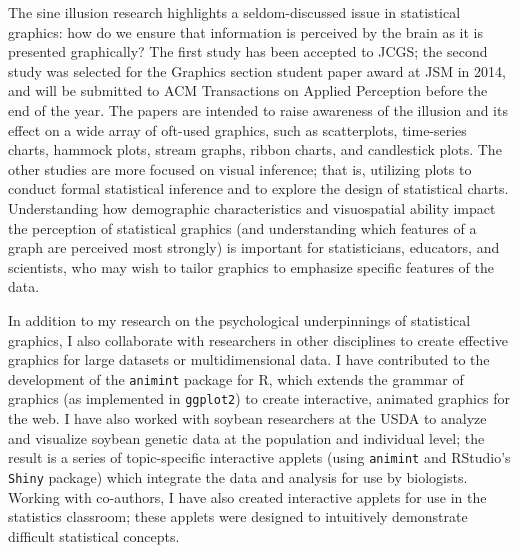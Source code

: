 \documentclass[11pt,letterpaper,sans,unicode]{moderncv}        %
\begin{document}
The sine illusion research highlights a seldom-discussed issue in statistical graphics: how do we ensure that information is perceived by the brain as it is presented graphically? The first study has been accepted to JCGS; the second study was selected for the Graphics section student paper award at JSM in 2014, and will be submitted to ACM Transactions on Applied Perception before the end of the year. The papers are intended to raise awareness of the illusion and its effect on a wide array of oft-used graphics, such as scatterplots, time-series charts, hammock plots, stream graphs, ribbon charts, and candlestick plots. The other studies are more focused on visual inference; that is, utilizing plots to conduct formal statistical inference and to explore the design of statistical charts. Understanding how demographic characteristics and visuospatial ability impact the perception of statistical graphics (and understanding which features of a graph are perceived most strongly) is important for statisticians, educators, and scientists, who may wish to tailor graphics to emphasize specific features of the data.

\vspace{.65cm}\hspace{8pt}In addition to my research on the psychological underpinnings of statistical graphics, I also collaborate with researchers in other disciplines to create effective graphics for large datasets or multidimensional data. I have contributed to the development of the \texttt{animint} package for R, which extends the grammar of graphics (as implemented in \texttt{ggplot2}) to create interactive, animated graphics for the web. I have also worked with soybean researchers at the USDA to analyze and visualize soybean genetic data at the population and individual level; the result is a series of topic-specific interactive applets (using \texttt{animint} and RStudio's \texttt{Shiny} package) which integrate the data and analysis for use by biologists. Working with co-authors, I have also created interactive applets for use in the statistics classroom; these applets were designed to intuitively demonstrate difficult statistical concepts. 
\end{document}

